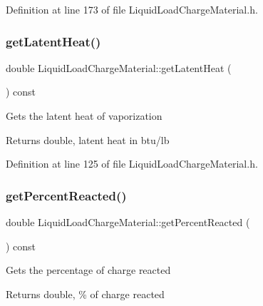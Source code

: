 Definition at line 173 of file Liquid\+Load\+Charge\+Material.\+h.

\mbox{\label{class_liquid_load_charge_material_aca3a38eb3343144042e9349b053da1bc}} 
\subsubsection{\texorpdfstring{get\+Latent\+Heat()}{getLatentHeat()}}
{\footnotesize\ttfamily double Liquid\+Load\+Charge\+Material\+::get\+Latent\+Heat (\begin{DoxyParamCaption}{ }\end{DoxyParamCaption}) const\hspace{0.3cm}{\ttfamily [inline]}}

Gets the latent heat of vaporization \begin{DoxyReturn}{Returns}
double, latent heat in btu/lb 
\end{DoxyReturn}


Definition at line 125 of file Liquid\+Load\+Charge\+Material.\+h.

\mbox{\label{class_liquid_load_charge_material_acfedb26800cbead9bf11c57e1356dd57}} 
\subsubsection{\texorpdfstring{get\+Percent\+Reacted()}{getPercentReacted()}}
{\footnotesize\ttfamily double Liquid\+Load\+Charge\+Material\+::get\+Percent\+Reacted (\begin{DoxyParamCaption}{ }\end{DoxyParamCaption}) const\hspace{0.3cm}{\ttfamily [inline]}}

Gets the percentage of charge reacted \begin{DoxyReturn}{Returns}
double, \% of charge reacted 
\end{DoxyReturn}


